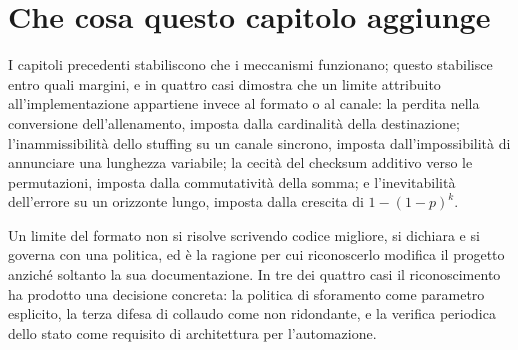 \section{Che cosa questo capitolo aggiunge}

I capitoli precedenti stabiliscono che i meccanismi funzionano; questo stabilisce entro quali margini, e in quattro casi dimostra che un limite attribuito all'implementazione appartiene invece al formato o al canale: la perdita nella conversione dell'allenamento, imposta dalla cardinalità della destinazione; l'inammissibilità dello stuffing su un canale sincrono, imposta dall'impossibilità di annunciare una lunghezza variabile; la cecità del checksum additivo verso le permutazioni, imposta dalla commutatività della somma; e l'inevitabilità dell'errore su un orizzonte lungo, imposta dalla crescita di $1-(1-p)^k$.

Un limite del formato non si risolve scrivendo codice migliore, si dichiara e si governa con una politica, ed è la ragione per cui riconoscerlo modifica il progetto anziché soltanto la sua documentazione. In tre dei quattro casi il riconoscimento ha prodotto una decisione concreta: la politica di sforamento come parametro esplicito, la terza difesa di collaudo come non ridondante, e la verifica periodica dello stato come requisito di architettura per l'automazione.
